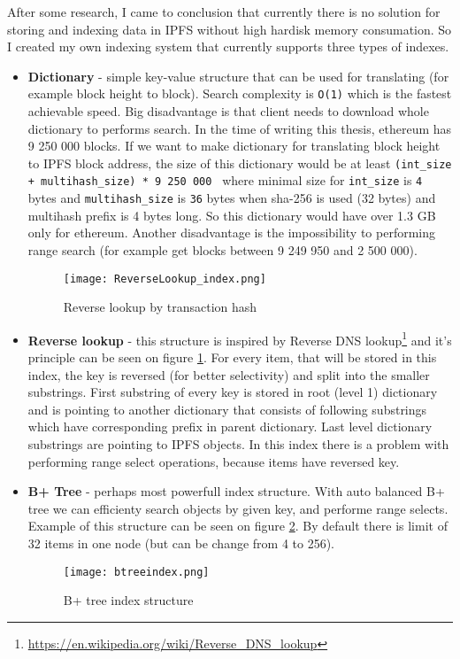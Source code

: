 After some research, I came to conclusion that currently there is no solution for storing and indexing data in IPFS without high hardisk memory consumation. So I created my own indexing system that currently supports three types of indexes.

\begin{itemize}
    \item \textbf{Dictionary} - simple key-value structure that can be used for translating (for example block height to block). Search complexity is \texttt{O(1)} which is the fastest achievable speed. Big disadvantage is that client needs to download whole dictionary to performs search. In the time of writing this thesis, ethereum has 9 250 000 blocks. If we want to make dictionary for translating block height to IPFS block address, the size of this dictionary would be at least \texttt{(int\_size + multihash\_size) * 9 250 000 } where minimal size for \texttt{int\_size} is \texttt{4} bytes and \texttt{multihash\_size} is \texttt{36} bytes when sha-256 is used (32 bytes) and multihash prefix is 4 bytes long. So this dictionary would have over 1.3 GB only for ethereum. Another disadvantage is the impossibility to performing range search (for example get blocks between 9 249 950 and 2 500 000).

    \begin{figure}[h]
        \centering
        \texttt{[image: ReverseLookup\_index.png]}
        \caption{Reverse lookup by transaction hash}
        \label{reverseLookupIndex}
    \end{figure}


    \item \textbf{Reverse lookup} - this structure is inspired by Reverse DNS lookup\footnote{\url{https://en.wikipedia.org/wiki/Reverse_DNS_lookup}} and it's principle can be seen on figure \ref{reverseLookupIndex}. For every item, that will be stored in this index, the key is reversed (for better selectivity) and split into the smaller substrings. First substring of every key is stored in root (level 1) dictionary and is pointing to another dictionary that consists of following substrings which have corresponding prefix in parent dictionary. Last level dictionary substrings are pointing to IPFS objects. In this index there is a problem with performing range select operations, because items have reversed key.
    \item \textbf{B+ Tree} - perhaps most powerfull index structure. With auto balanced B+ tree we can efficienty search objects by given key, and performe range selects. Example of this structure can be seen on figure \ref{btreeindex}. By default there is limit of 32 items in one node (but can be change from 4 to 256). 
    


    \begin{figure}[h]
        \centering
        \texttt{[image: btreeindex.png]}
        \caption{B+ tree index structure}
        \label{btreeindex}
    \end{figure}

\end{itemize}

